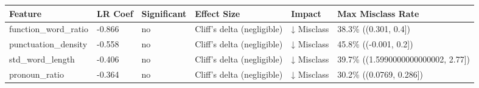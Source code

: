 \begin{tabular}{llllll}
\toprule
Feature & LR Coef & Significant & Effect Size & Impact & Max Misclass Rate \\
\midrule
function\_word\_ratio & -0.866 & no & Cliff's delta (negligible) & ↓ Misclass & 38.3\% ((0.301, 0.4]) \\
punctuation\_density & -0.558 & no & Cliff's delta (negligible) & ↓ Misclass & 45.8\% ((-0.001, 0.2]) \\
std\_word\_length & -0.406 & no & Cliff's delta (negligible) & ↓ Misclass & 39.7\% ((1.5990000000000002, 2.77]) \\
pronoun\_ratio & -0.364 & no & Cliff's delta (negligible) & ↓ Misclass & 30.2\% ((0.0769, 0.286]) \\
\bottomrule
\end{tabular}
